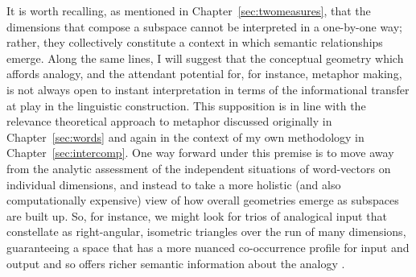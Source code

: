 It is worth recalling, as mentioned in Chapter~\ref{sec:twomeasures}, that the dimensions that compose a subspace cannot be interpreted in a one-by-one way; rather, they collectively constitute a context in which semantic relationships emerge.  Along the same lines, I will suggest that the conceptual geometry which affords analogy, and the attendant potential for, for instance, metaphor making, is not always open to instant interpretation in terms of the informational transfer at play in the linguistic construction.  This supposition is in line with the relevance theoretical approach to metaphor discussed originally in Chapter~\ref{sec:words} and again in the context of my own methodology in Chapter~\ref{sec:intercomp}.  One way forward under this premise is to move away from the analytic assessment of the independent situations of word-vectors on individual dimensions, and instead to take a more holistic (and also computationally expensive) view of how overall geometries emerge as subspaces are built up.  So, for instance, we might look for trios of analogical input that constellate as right-angular, isometric triangles over the run of many dimensions, guaranteeing a space that has a more nuanced co-occurrence profile for input and output and so offers richer semantic information about the analogy \citep[a similar idea is discussed in][]{McGregorEA2016}.

